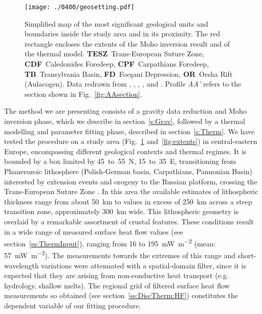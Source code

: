 \begin{figure}
    \begin{adjustbox}{center}
        \texttt{[image: ./0400/geosetting.pdf]}
    \end{adjustbox}
	\caption{Simplified map of the most significant geological units and boundaries inside the study area and in its proximity. The red rectangle encloses the extents of the Moho inversion result and of the thermal model. \textbf{TESZ}~Trans-European Suture Zone, \textbf{CDF}~Caledonides Foredeep, \textbf{CPF}~Carpathians Foredeep, \textbf{TB}~Transylvania Basin, \textbf{FD}~Focşani Depression, \textbf{OR}~Orsha Rift (Aulacogen). Data redrawn from \textcite{Tarapoanca2003}, \textcite{EuCRUST07}, \textcite{Artemieva2013}, \textcite{Mazur2016}, and \textcite{Starostenko2018}. Profile \textit{AA'} refers to the section shown in Fig.~\ref{fig:AAsection}.}
    \label{fig:geosetting}
\end{figure}

The method we are presenting consists of a gravity data reduction and Moho inversion phase, which we describe in section~\ref{s:Grav}, followed by a thermal modelling and parameter fitting phase, described in section~\ref{s:Therm}.
We have tested the procedure on a study area (Fig.~\ref{fig:geosetting} and~\ref{fig:extents}) in central-eastern Europe, encompassing different geological contexts and thermal regimes.
It is bounded by a box limited by 45~to~55\textdegree~N, 15~to~35\textdegree~E, transitioning from Phanerozoic lithosphere (Polish-German basin, Carpathians, Pannonian Basin) interested by extension events and orogeny to the Russian platform, crossing the Trans-European Suture Zone \parencite[TESZ,][]{Jones2010}.
In this area the available estimates of lithospheric thickness range from about 50~km to values in excess of 250~km across a steep transition zone, approximately 300~km wide.
This lithospheric geometry is overlaid by a remarkable assortment of crustal features.
These conditions result in a wide range of measured surface heat flow values (see section~\ref{ss:ThermInput}), ranging from 16 to 195~\si{\milli \watt \per \square \metre} (mean: 57~\si{\milli \watt \per \square \metre}).
The measurements towards the extremes of this range and short-wavelength variations were attenuated with a spatial-domain filter, since it is expected that they are arising from non-conductive heat transport (e.g. hydrology, shallow melts).
The regional grid of filtered surface heat flow measurements so obtained (see section~\ref{ss:DiscTherm:HF}) constitutes the dependent variable of our fitting procedure.

